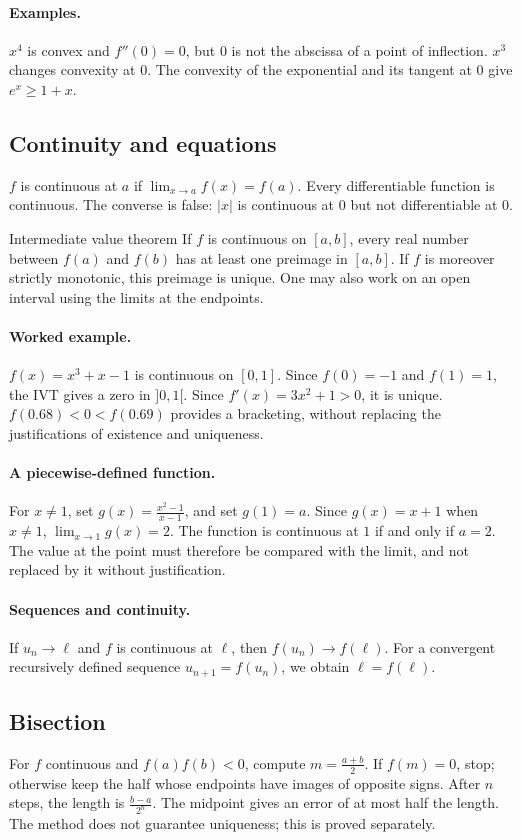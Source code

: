 \paragraph{Examples.} $x^4$ is convex and $f''(0)=0$, but $0$ is not the abscissa of a point of inflection. $x^3$ changes convexity at $0$. The convexity of the exponential and its tangent at $0$ give $e^x\ge1+x$.
\subsection{Continuity and equations}
$f$ is continuous at $a$ if $\lim_{x\to a}f(x)=f(a)$. Every differentiable function is continuous. The converse is false: $|x|$ is continuous at $0$ but not differentiable at $0$.
\begin{retenir}{Intermediate value theorem}
If $f$ is continuous on $[a,b]$, every real number between $f(a)$ and $f(b)$ has at least one preimage in $[a,b]$. If $f$ is moreover strictly monotonic, this preimage is unique. One may also work on an open interval using the limits at the endpoints.
\end{retenir}
\paragraph{Worked example.} $f(x)=x^3+x-1$ is continuous on $[0,1]$. Since $f(0)=-1$ and $f(1)=1$, the IVT gives a zero in $]0,1[$. Since $f'(x)=3x^2+1>0$, it is unique. $f(0.68)<0<f(0.69)$ provides a bracketing, without replacing the justifications of existence and uniqueness.
\paragraph{A piecewise-defined function.} For $x\ne1$, set $g(x)=\frac{x^2-1}{x-1}$, and set $g(1)=a$. Since $g(x)=x+1$ when $x\ne1$, $\lim_{x\to1}g(x)=2$. The function is continuous at $1$ if and only if $a=2$. The value at the point must therefore be compared with the limit, and not replaced by it without justification.
\paragraph{Sequences and continuity.} If $u_n\to\ell$ and $f$ is continuous at $\ell$, then $f(u_n)\to f(\ell)$. For a convergent recursively defined sequence $u_{n+1}=f(u_n)$, we obtain $\ell=f(\ell)$.
\subsection{Bisection}
For $f$ continuous and $f(a)f(b)<0$, compute $m=\frac{a+b}{2}$. If $f(m)=0$, stop; otherwise keep the half whose endpoints have images of opposite signs. After $n$ steps, the length is $\frac{b-a}{2^n}$. The midpoint gives an error of at most half the length. The method does not guarantee uniqueness; this is proved separately.


